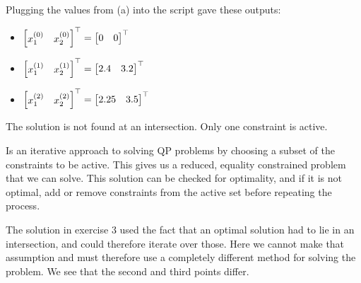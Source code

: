 
\begin{center}
\end{center}


Plugging the values from (a) into the script gave these outputs:

\begin{itemize}
  \item $\begin{bmatrix} x_1^{(0)} & x_2^{(0)} \end{bmatrix}^{\top} = \begin{bmatrix} 0 & 0 \end{bmatrix}^{\top}$
  \item $\begin{bmatrix} x_1^{(1)} & x_2^{(1)} \end{bmatrix}^{\top} = \begin{bmatrix} 2.4 & 3.2 \end{bmatrix}^{\top}$
  \item $\begin{bmatrix} x_1^{(2)} & x_2^{(2)} \end{bmatrix}^{\top} = \begin{bmatrix} 2.25 & 3.5 \end{bmatrix}^{\top}$
\end{itemize}

\begin{center}
\end{center}

The solution is not found at an intersection. Only one constraint is active.


Is an iterative approach to solving QP problems by choosing a subset of the constraints to be active. 
This gives us a reduced, equality constrained problem that we can solve. This solution can be checked for optimality, and if it is not optimal, add or remove constraints 
from the active set before repeating the process.  


The solution in exercise 3 used the fact that an optimal solution had to lie in an intersection, and could therefore iterate over those. Here we cannot make that assumption
and must therefore use a completely different method for solving the problem. We see that the second and third points differ. 